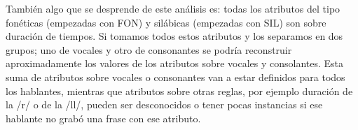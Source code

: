 También algo que se desprende de este análisis es: todas los atributos del tipo fonéticas (empezadas con FON) y silábicas (empezadas con SIL) son sobre duración de tiempos. Si tomamos todos estos atributos y los separamos en dos grupos; uno de vocales y otro de consonantes se podría reconstruir aproximadamente los valores de los atributos sobre vocales y consolantes. Esta suma de atributos sobre vocales o consonantes van a estar definidos para todos los hablantes, mientras que atributos sobre otras reglas, por ejemplo duración de la /r/ o de la /ll/, pueden ser desconocidos o tener pocas instancias si ese hablante no grabó una frase con ese atributo. 



